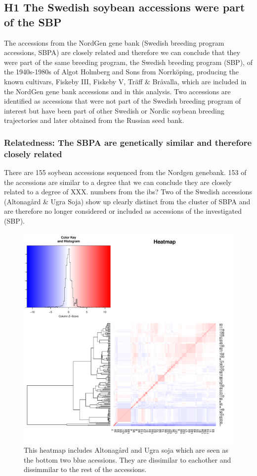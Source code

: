 \documentclass[9pt, onecolumn,twoside]{gsajnl}
\begin{document}
\subsection{H1 The Swedish soybean accessions were part of the SBP}
The accessions from the NordGen gene bank (Swedish breeding program accessions, SBPA) are closely related and therefore we can conclude that they were part of the same breeding program, the Swedish breeding program (SBP), of the 1940s-1980s of Algot Holmberg and Sons from Norrköping, producing the known cultivars, Fiskeby III, Fiskeby V, Träff $\&$ Bråvalla, which are included in the NordGen gene bank accessions and in this analysis. Two accessions are identified as accessions that were not part of the Swedish breeding program of interest but have been part of other Swedish or Nordic soybean breeding trajectories and later obtained from the Russian seed bank. 

\subsubsection{Relatedness: The SBPA are genetically similar and therefore closely related}
There are 155 soybean accessions sequenced from the Nordgen genebank. 153 of the accessions are similar to a degree that we can conclude they are closely related to a degree of XXX.  numbers from the ibs?
Two of the Swedish accessions (Altonagård \& Ugra Soja) show up clearly distinct from the cluster of SBPA and are therefore no longer considered or included as accessions of the investigated (SBP).  
\begin{figure}
\centering
\includegraphics[width=\linewidth]{plot_heatmap.pdf}
\caption{This heatmap includes Altonagård and Ugra soja which are seen as the bottom two blue acessions. They are dissimilar to eachother and dissimmilar to the rest of the accessions.}
\label{fig:heat}
\end{figure}
\end{document}
